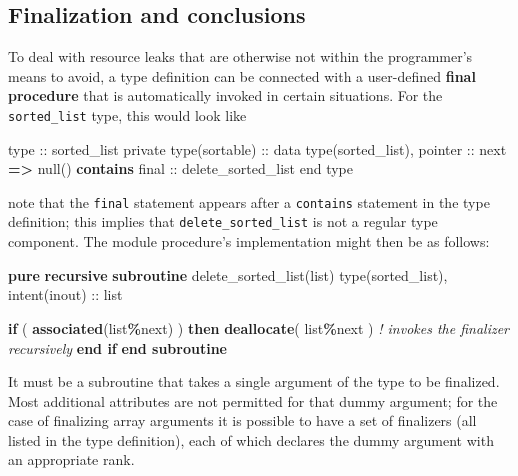 \documentclass[
  paper=a4,
  ,captions=tableheading
]{scrartcl}
\newenvironment{Shaded}{\begin{snugshade}}{\end{snugshade}}
\newcommand{\CommentTok}[1]{\textcolor[rgb]{0.56,0.35,0.01}{\textit{#1}}}
\newcommand{\DataTypeTok}[1]{\textcolor[rgb]{0.13,0.29,0.53}{#1}}
\newcommand{\FunctionTok}[1]{\textcolor[rgb]{0.13,0.29,0.53}{\textbf{#1}}}
\newcommand{\KeywordTok}[1]{\textcolor[rgb]{0.13,0.29,0.53}{\textbf{#1}}}
\newcommand{\NormalTok}[1]{#1}
\newcommand{\OperatorTok}[1]{\textcolor[rgb]{0.81,0.36,0.00}{\textbf{#1}}}
\begin{document}
\subsection{Finalization and
conclusions}\label{finalization-and-conclusions}

To deal with resource leaks that are otherwise not within the
programmer's means to avoid, a type definition can be connected with a
user-defined \textbf{final procedure} that is automatically invoked in
certain situations. For the \texttt{sorted\_list} type, this would look
like

\begin{Shaded}
\begin{Highlighting}[]
\DataTypeTok{type} \DataTypeTok{::}\NormalTok{ sorted\_list}
  \DataTypeTok{private}
  \DataTypeTok{type(sortable)} \DataTypeTok{::}\NormalTok{ data}
  \DataTypeTok{type(sorted\_list)}\NormalTok{, }\DataTypeTok{pointer} \DataTypeTok{::}\NormalTok{ next }\KeywordTok{=}\OperatorTok{\textgreater{}}\NormalTok{ null()}
\KeywordTok{contains}
  \DataTypeTok{final} \DataTypeTok{::}\NormalTok{ delete\_sorted\_list}
\DataTypeTok{end type}
\end{Highlighting}
\end{Shaded}

note that the \texttt{final} statement appears after a \texttt{contains}
statement in the type definition; this implies that
\texttt{delete\_sorted\_list} is not a regular type component. The
module procedure's implementation might then be as follows:

\begin{Shaded}
\begin{Highlighting}[]
\KeywordTok{pure} \KeywordTok{recursive} \KeywordTok{subroutine}\NormalTok{ delete\_sorted\_list(list)}
  \DataTypeTok{type(sorted\_list)}\NormalTok{, }\DataTypeTok{intent(inout)} \DataTypeTok{::}\NormalTok{ list}

  \KeywordTok{if}\NormalTok{ ( }\FunctionTok{associated}\NormalTok{(list}\OperatorTok{\%}\NormalTok{next) ) }\KeywordTok{then}
    \KeywordTok{deallocate}\NormalTok{( list}\OperatorTok{\%}\NormalTok{next )  }\CommentTok{! invokes the finalizer recursively}
  \KeywordTok{end if}
\KeywordTok{end subroutine}
\end{Highlighting}
\end{Shaded}

It must be a subroutine that takes a single argument of the type to be
finalized. Most additional attributes are not permitted for that dummy
argument; for the case of finalizing array arguments it is possible to
have a set of finalizers (all listed in the type definition), each of
which declares the dummy argument with an appropriate rank.
\end{document}
